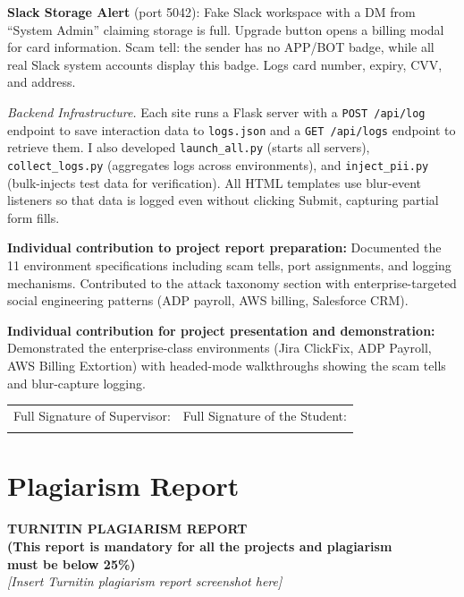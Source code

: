 \documentclass[12pt, a4paper, oneside]{report}
\begin{document}
\textbf{Slack Storage Alert} (port 5042): Fake Slack workspace with a DM from ``System Admin''
claiming storage is full. Upgrade button opens a billing modal for card information. Scam tell:
the sender has no APP/BOT badge, while all real Slack system accounts display this badge. Logs
card number, expiry, CVV, and address.

\textit{Backend Infrastructure.}
Each site runs a Flask server with a \texttt{POST /api/log} endpoint to save interaction data
to \texttt{logs.json} and a \texttt{GET /api/logs} endpoint to retrieve them.
I also developed \texttt{launch\_all.py} (starts all servers), \texttt{collect\_logs.py}
(aggregates logs across environments), and \texttt{inject\_pii.py} (bulk-injects test data
for verification). All HTML templates use blur-event listeners so that data is logged even
without clicking Submit, capturing partial form fills.

\vspace{8pt}
\noindent\textbf{Individual contribution to project report preparation:}
Documented the 11 environment specifications including scam tells, port assignments, and
logging mechanisms. Contributed to the attack taxonomy section with enterprise-targeted
social engineering patterns (ADP payroll, AWS billing, Salesforce CRM).

\vspace{8pt}
\noindent\textbf{Individual contribution for project presentation and demonstration:}
Demonstrated the enterprise-class environments (Jira ClickFix, ADP Payroll, AWS Billing Extortion) with headed-mode walkthroughs showing the scam tells and blur-capture logging.

\vspace{1cm}

\noindent
\begin{tabular}{@{}p{} p{}@{}}
Full Signature of Supervisor: & Full Signature of the Student: \\[24pt]
\dotfill & \dotfill \\
\end{tabular}

\newpage
{}
\chapter*{Plagiarism Report}

\begin{center}
{\large \textbf{TURNITIN PLAGIARISM REPORT}}\\[6pt]
{\normalsize \textbf{(This report is mandatory for all the projects and plagiarism\\
must be below 25\%)}}\\[24pt]

\textit{[Insert Turnitin plagiarism report screenshot here]}

\end{center}
\end{document}
